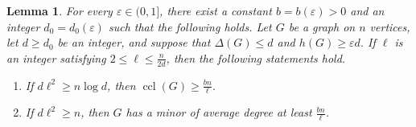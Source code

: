 \documentclass[10pt,a4paper]{amsart}
\newtheorem{lemma}{Lemma}
\DeclareMathOperator{\ccl}{ccl}
\newcommand{\eps}{\varepsilon}
\begin{document}
\begin{lemma}\label{lem:scale}
For every $\eps\in(0,1]$, there exist a constant $b=b(\eps)>0$ and an
integer $d_0=d_0(\eps)$ such that the following holds. Let $G$ be a
graph on $n$ vertices, let $d\ge d_0$ be an integer, and suppose that
$\Delta(G)\le d$ and $h(G)\ge\eps d$. If $\ell$ is an integer
satisfying $2\le\ell\le\frac{n}{2d}$, then the following statements hold.
\begin{enumerate}[label=\textup{(\roman*)}]
 \item If $d\ell^2\ge n\log d$, then
       $\ccl(G)\ge\frac{bn}{\ell}$.
 \item If $d\ell^2\ge n$, then $G$ has a minor of average degree at
       least $\frac{bn}{\ell}$.
\end{enumerate}
\end{lemma}
\end{document}
